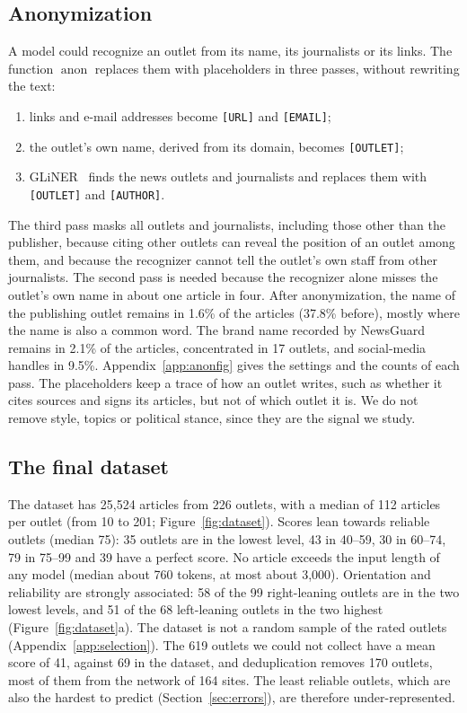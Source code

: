 \documentclass[11pt,a4paper]{article}
\newcommand{\anon}{\operatorname{anon}}
\begin{document}
\subsection{Anonymization}\label{sec:anon}
A model could recognize an outlet from its name, its journalists or its links. The function $\anon$ replaces them with
placeholders in three passes, without rewriting the text:
\begin{enumerate}
  \item links and e-mail addresses become \texttt{[URL]} and \texttt{[EMAIL]};
  \item the outlet's own name, derived from its domain, becomes \texttt{[OUTLET]};
  \item GLiNER~\cite{zaratiana2024gliner} finds the news outlets and journalists and replaces them with
        \texttt{[OUTLET]} and \texttt{[AUTHOR]}.
\end{enumerate}
The third pass masks all outlets and journalists, including those other than the publisher, because citing other
outlets can reveal the position of an outlet among them, and because the recognizer cannot tell the outlet's own staff
from other journalists. The second pass is needed because the recognizer alone misses the outlet's own name in about one
article in four. After anonymization, the name of the publishing outlet remains in 1.6\% of the articles (37.8\%
before), mostly where the name is also a common word. The brand name recorded by NewsGuard remains in 2.1\% of the
articles, concentrated in 17 outlets, and social-media handles in 9.5\%. Appendix~\ref{app:anonfig} gives
the settings and the counts of each pass. The placeholders keep a trace of how an outlet writes, such as whether it
cites sources and signs its articles, but not of which outlet it is. We do not remove style, topics or political stance,
since they are the signal we study.

\subsection{The final dataset}\label{sec:final}
The dataset has 25,524 articles from 226 outlets, with a median of 112 articles per outlet (from 10 to 201;
Figure~\ref{fig:dataset}). Scores lean towards reliable outlets (median 75): 35 outlets are in the lowest level, 43 in
40--59, 30 in 60--74, 79 in 75--99 and 39 have a perfect score. No article exceeds the input length of any model (median
about 760 tokens, at most about 3,000). Orientation and reliability are strongly associated: 58 of the 99 right-leaning
outlets are in the two lowest levels, and 51 of the 68 left-leaning outlets in the two highest
(Figure~\ref{fig:dataset}a). The dataset is not a random sample of the rated outlets (Appendix~\ref{app:selection}). The
619 outlets we could not collect have a mean score of 41, against 69 in the dataset, and deduplication removes 170
outlets, most of them from the network of 164 sites. The least reliable outlets, which are also the hardest to predict
(Section~\ref{sec:errors}), are therefore under-represented.
\end{document}
